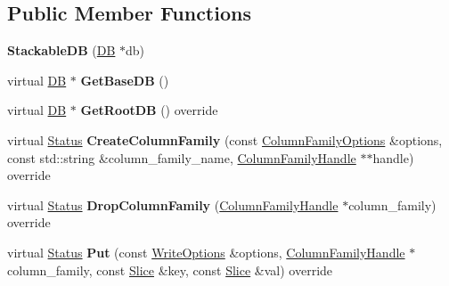 \subsection*{Public Member Functions}
\begin{DoxyCompactItemize}
\item 
{\bfseries Stackable\+DB} (\hyperlink{classrocksdb_1_1DB}{DB} $\ast$db)\hypertarget{classrocksdb_1_1StackableDB_a89d74ac1fa1f2ec1d1e8a64e31236c81}{}\label{classrocksdb_1_1StackableDB_a89d74ac1fa1f2ec1d1e8a64e31236c81}

\item 
virtual \hyperlink{classrocksdb_1_1DB}{DB} $\ast$ {\bfseries Get\+Base\+DB} ()\hypertarget{classrocksdb_1_1StackableDB_aa38d3457c863850fc9958339f8cf5c3a}{}\label{classrocksdb_1_1StackableDB_aa38d3457c863850fc9958339f8cf5c3a}

\item 
virtual \hyperlink{classrocksdb_1_1DB}{DB} $\ast$ {\bfseries Get\+Root\+DB} () override\hypertarget{classrocksdb_1_1StackableDB_a7d97bedcb6f061b7e17fd0bd6d03b7b4}{}\label{classrocksdb_1_1StackableDB_a7d97bedcb6f061b7e17fd0bd6d03b7b4}

\item 
virtual \hyperlink{classrocksdb_1_1Status}{Status} {\bfseries Create\+Column\+Family} (const \hyperlink{structrocksdb_1_1ColumnFamilyOptions}{Column\+Family\+Options} \&options, const std\+::string \&column\+\_\+family\+\_\+name, \hyperlink{classrocksdb_1_1ColumnFamilyHandle}{Column\+Family\+Handle} $\ast$$\ast$handle) override\hypertarget{classrocksdb_1_1StackableDB_aee3f488bdee01e121f4d2826b29c14f6}{}\label{classrocksdb_1_1StackableDB_aee3f488bdee01e121f4d2826b29c14f6}

\item 
virtual \hyperlink{classrocksdb_1_1Status}{Status} {\bfseries Drop\+Column\+Family} (\hyperlink{classrocksdb_1_1ColumnFamilyHandle}{Column\+Family\+Handle} $\ast$column\+\_\+family) override\hypertarget{classrocksdb_1_1StackableDB_a776b6afebaaa4a307f1ef1e9ae3dd929}{}\label{classrocksdb_1_1StackableDB_a776b6afebaaa4a307f1ef1e9ae3dd929}

\item 
virtual \hyperlink{classrocksdb_1_1Status}{Status} {\bfseries Put} (const \hyperlink{structrocksdb_1_1WriteOptions}{Write\+Options} \&options, \hyperlink{classrocksdb_1_1ColumnFamilyHandle}{Column\+Family\+Handle} $\ast$column\+\_\+family, const \hyperlink{classrocksdb_1_1Slice}{Slice} \&key, const \hyperlink{classrocksdb_1_1Slice}{Slice} \&val) override\hypertarget{classrocksdb_1_1StackableDB_a2d0bfc2da1c6d04e5632515045dd02c9}{}\label{classrocksdb_1_1StackableDB_a2d0bfc2da1c6d04e5632515045dd02c9}


\end{DoxyCompactItemize}
